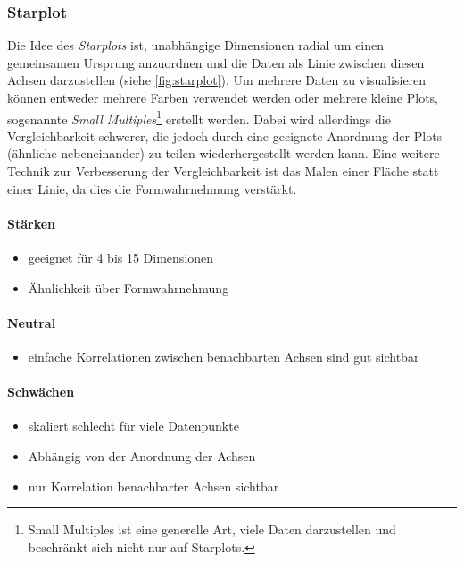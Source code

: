 			\subsubsection{Starplot}
				Die Idee des \emph{Starplots} ist, unabhängige Dimensionen radial um einen gemeinsamen Ursprung anzuordnen und die Daten als Linie zwischen diesen Achsen darzustellen (siehe \autoref{fig:starplot}). Um mehrere Daten zu visualisieren können entweder mehrere Farben verwendet werden oder mehrere kleine Plots, sogenannte \emph{Small Multiples}\footnote{Small Multiples ist eine generelle Art, viele Daten darzustellen und beschränkt sich nicht nur auf Starplots.} erstellt werden. Dabei wird allerdings die Vergleichbarkeit schwerer, die jedoch durch eine geeignete Anordnung der Plots (ähnliche nebeneinander) zu teilen wiederhergestellt werden kann. Eine weitere Technik zur Verbesserung der Vergleichbarkeit ist das Malen einer Fläche statt einer Linie, da dies die Formwahrnehmung verstärkt.

				\paragraph{Stärken}
				\begin{itemize}
					\item geeignet für 4 bis 15 Dimensionen
					\item Ähnlichkeit über Formwahrnehmung
				\end{itemize}

				\paragraph{Neutral}
				\begin{itemize}
					\item einfache Korrelationen zwischen benachbarten Achsen sind gut sichtbar
				\end{itemize}

				\paragraph{Schwächen}
				\begin{itemize}
					\item skaliert schlecht für viele Datenpunkte
					\item Abhängig von der Anordnung der Achsen
					\item nur Korrelation benachbarter Achsen sichtbar
				\end{itemize}

